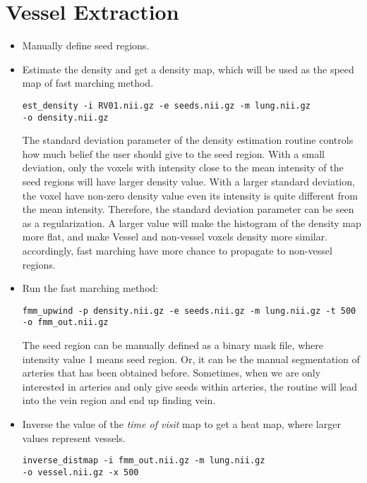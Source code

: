 \documentclass[11pt]{article}
\begin{document}
\section{Vessel Extraction}
\begin{itemize}
\item Manually define seed regions.

\item Estimate the density and get a density map, which will be used as the
  speed map of fast marching method. 
\begin{Verbatim}[frame=single]
est_density -i RV01.nii.gz -e seeds.nii.gz -m lung.nii.gz 
-o density.nii.gz
\end{Verbatim}
The standard deviation parameter of the density estimation routine controls
how much belief the user should give to the seed region. With a small
deviation, only the voxels with intensity close to the mean intensity of the
seed regions will have larger density value. With a larger standard deviation,
the voxel have non-zero density value even its intensity is quite different
from the mean intensity. Therefore, the standard deviation parameter can be
seen as a regularization. A larger value will make the histogram of the
density map more flat, and make Vessel and non-vessel voxels density more
similar. accordingly, fast marching have more chance to propagate to
non-vessel regions.

  \item Run the fast marching method:
\begin{Verbatim}[frame=single]
fmm_upwind -p density.nii.gz -e seeds.nii.gz -m lung.nii.gz -t 500 
-o fmm_out.nii.gz
\end{Verbatim}
The seed region can be manually defined as a binary mask file, where intensity
value 1 means seed region. Or, it can be the manual segmentation of arteries
that has been obtained before. Sometimes, when we are only interested in
arteries and only give seeds within arteries, the routine will lead into the
vein region and end up finding vein. 

\item Inverse the value of the \emph{time of visit} map to get a heat map,
  where larger values represent vessels. 
\begin{Verbatim}[frame=single]
inverse_distmap -i fmm_out.nii.gz -m lung.nii.gz 
-o vessel.nii.gz -x 500
\end{Verbatim}
\end{itemize}



\end{document}
